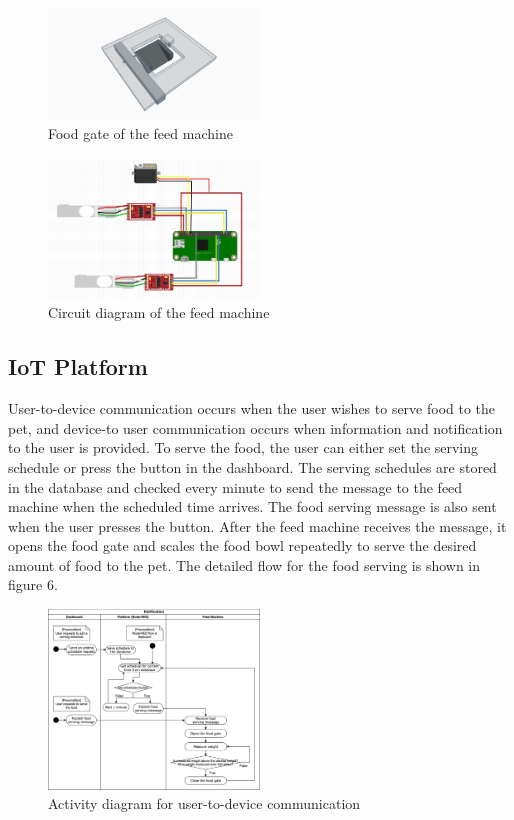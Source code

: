 ﻿\documentclass[conference]{IEEEtran}
\begin{document}
\begin{figure}[htbp]
\centerline{\includegraphics[width=0.5\textwidth]{./images/servo_gate.png}}
\caption{Food gate of the feed machine}
\label{fig}
\end{figure}

\begin{figure}[htbp]
\centerline{\includegraphics[width=0.5\textwidth]{./images/feed machine circuit.jpg}}
\caption{Circuit diagram of the feed machine}
\label{fig}
\end{figure}

\subsection{IoT Platform}
User-to-device communication occurs when the user wishes to serve food to the pet, and device-to user communication occurs when information and notification to the user is provided.
To serve the food, the user can either set the serving schedule or press the button in the dashboard.
The serving schedules are stored in the database and checked every minute to send the message to the feed machine when the scheduled time arrives.
The food serving message is also sent when the user presses the button.
After the feed machine receives the message, it opens the food gate and scales the food bowl repeatedly to serve the desired amount of food to the pet.
The detailed flow for the food serving is shown in figure 6.

\begin{figure}[htbp]
\centerline{\includegraphics[width=0.5\textwidth]{./images/user2device.png}}
\caption{Activity diagram for user-to-device communication}
\label{fig}
\end{figure}
\end{document}
